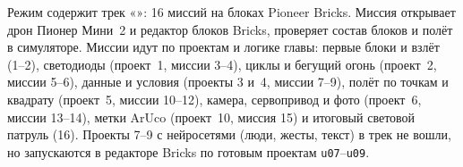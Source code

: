 \begin{missionbox}
Режим  содержит трек «»: 16 миссий на блоках Pioneer Bricks. Миссия открывает дрон Пионер Мини~2 и редактор блоков Bricks, проверяет состав блоков и полёт в симуляторе. Миссии идут по проектам и логике главы: первые блоки и взлёт (1--2), светодиоды (проект~1, миссии 3--4), циклы и бегущий огонь (проект~2, миссии 5--6), данные и условия (проекты 3 и~4, миссии 7--9), полёт по точкам и квадрату (проект~5, миссии 10--12), камера, сервопривод и фото (проект~6, миссии 13--14), метки ArUco (проект~10, миссия 15) и итоговый световой патруль (16). Проекты 7--9 с нейросетями (люди, жесты, текст) в трек не вошли, но запускаются в редакторе Bricks по готовым проектам \texttt{u07}--\texttt{u09}.
\end{missionbox}
